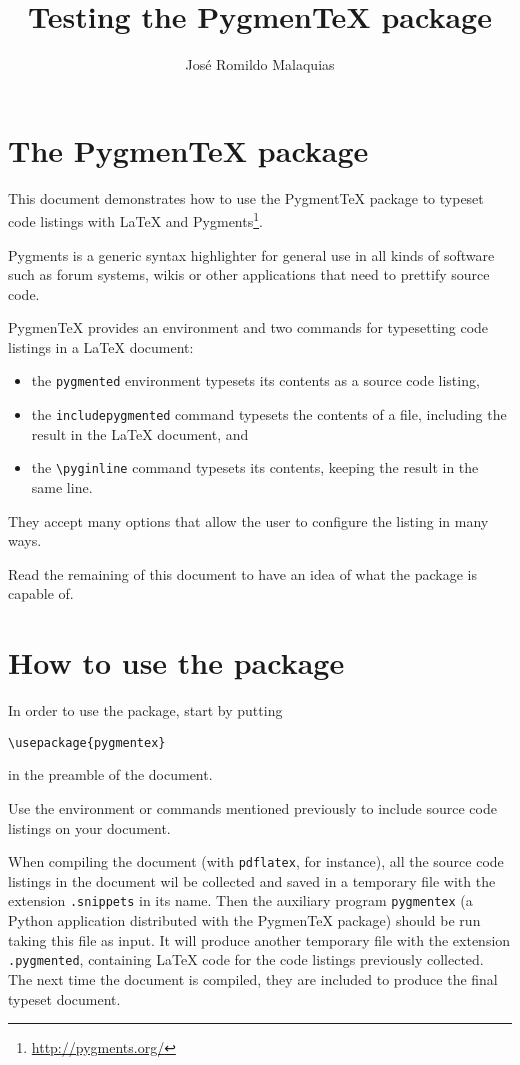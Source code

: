 \documentclass[10pt,a4paper]{article}
\begin{document}
\title{Testing the Pygmen\TeX{} package}
\author{José Romildo Malaquias}
\maketitle

\section{The Pygmen\TeX{} package}

This document demonstrates how to use the Pygment\TeX{} package to
typeset code listings with \LaTeX{} and
Pygments\footnote{\url{http://pygments.org/}}.

Pygments is a generic syntax highlighter for general use in all kinds of
software such as forum systems, wikis or other applications that need to
prettify source code.

Pygmen\TeX{} provides an environment and two commands for typesetting code
listings in a \LaTeX{} document:
\begin{itemize}
  \item the \verb|pygmented| environment typesets its contents as a
  source code listing,
  \item the \verb|includepygmented| command typesets the contents of a
  file, including the result in the \LaTeX{} document, and
  \item the \verb|\pyginline| command typesets its contents, keeping the
  result in the same line.
\end{itemize}
They accept many options that allow the user to configure the listing in
many ways.

Read the remaining of this document to have an idea of what the package
is capable of.

\section{How to use the package}

In order to use the package, start by putting
\begin{verbatim}
\usepackage{pygmentex}
\end{verbatim}
in the preamble of the document.

Use the environment or commands mentioned previously to include source
code listings on your document.

When compiling the document (with \texttt{pdflatex}, for instance), all
the source code listings in the document wil be collected and saved in a
temporary file with the extension \texttt{.snippets} in its name. Then
the auxiliary program \texttt{pygmentex} (a Python application
distributed with the Pygmen\TeX{} package) should be run taking this
file as input. It will produce another temporary file with the extension
\texttt{.pygmented}, containing \LaTeX{} code for the code listings
previously collected. The next time the document is compiled, they are
included to produce the final typeset document.
\end{document}
